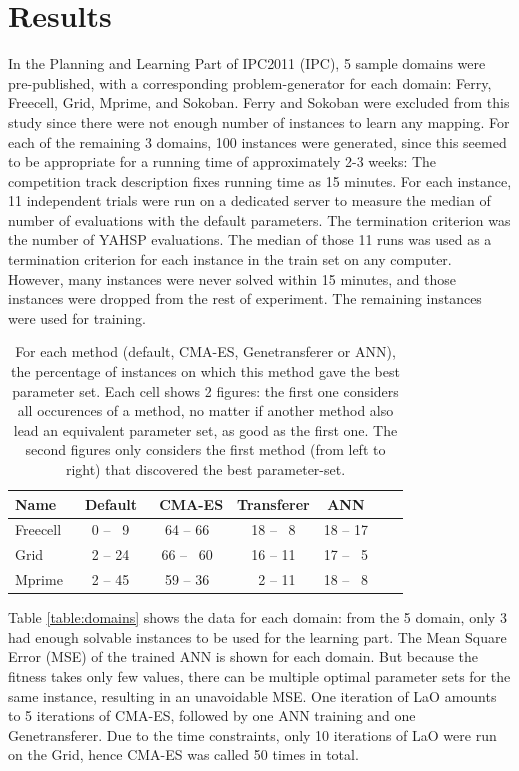 \documentclass{MYsig-alternate}
\begin{document}
\section{Results}
\label{section:results}

In the Planning and Learning Part of IPC2011 (IPC), 5 sample domains were pre-published, with a corresponding problem-generator for each domain: Ferry, Freecell, Grid, Mprime, and Sokoban. Ferry and Sokoban were excluded from this study since there were not enough number of instances to learn any mapping. For each of the remaining 3 domains, 100 instances were generated, since this seemed to be appropriate for a running time of approximately 2-3 weeks: The competition track description fixes running time as 15 minutes. For each instance, 11 independent trials were run on a dedicated server to measure the median of number of evaluations with the default parameters. The termination criterion was the number of YAHSP evaluations. The median of those 11 runs was used as a termination criterion for each instance in the train set on any computer. However, many instances were never solved within 15 minutes, and those instances were dropped from the rest of experiment. The remaining instances were used for training.


 \begin{table}[tb!]
\centering
\begin{tabular}{l c c c c c c}
\hline\hline
Name & \ Default & \ CMA-ES &  Transferer & ANN \\ 
\hline
Freecell & ~0 -- ~9& 64 -- 66  & 18 -- ~8  & 18 -- 17     \\
Grid & ~2 -- 24 & 66 -- ~60  & 16 -- 11 & 17 -- ~5  &    \\
Mprime &  ~2 -- 45& 59 -- 36 & ~2 -- 11  & 18 -- ~8  &    \\
\hline
\end{tabular}
\caption{For each method (default, CMA-ES, Genetransferer or ANN), the percentage of instances on which this method gave the best parameter set. Each cell shows 2 figures: the first one considers all occurences of a method, no matter if another method also lead an equivalent parameter set, as good as the first one. The second figures only considers the first method (from left to right) that discovered the best parameter-set.}
\label{table:hints}
\end{table} 


Table \ref{table:domains} shows the data for each domain: from the 5 domain, only 3 had enough solvable instances to be used for the learning part. The Mean Square Error (MSE) of the trained ANN is shown for each domain. But because the fitness takes only few values, there can be multiple optimal parameter sets for the same instance, resulting in an unavoidable MSE. 
One iteration of LaO amounts to 5 iterations of CMA-ES, followed by one ANN training and one Genetransferer. Due to the time constraints, only 10 iterations of LaO were run on the Grid, hence CMA-ES was called 50 times in total.
\end{document}
